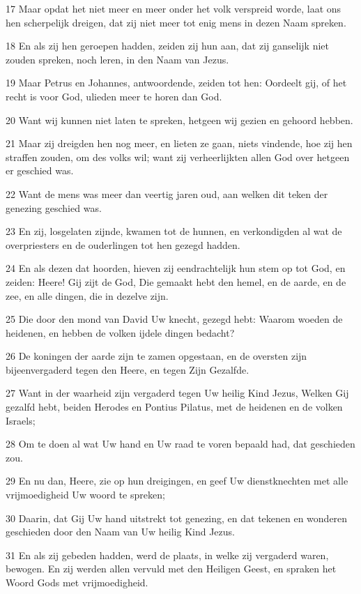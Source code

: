 \par 17 Maar opdat het niet meer en meer onder het volk verspreid worde, laat ons hen scherpelijk dreigen, dat zij niet meer tot enig mens in dezen Naam spreken.
\par 18 En als zij hen geroepen hadden, zeiden zij hun aan, dat zij ganselijk niet zouden spreken, noch leren, in den Naam van Jezus.
\par 19 Maar Petrus en Johannes, antwoordende, zeiden tot hen: Oordeelt gij, of het recht is voor God, ulieden meer te horen dan God.
\par 20 Want wij kunnen niet laten te spreken, hetgeen wij gezien en gehoord hebben.
\par 21 Maar zij dreigden hen nog meer, en lieten ze gaan, niets vindende, hoe zij hen straffen zouden, om des volks wil; want zij verheerlijkten allen God over hetgeen er geschied was.
\par 22 Want de mens was meer dan veertig jaren oud, aan welken dit teken der genezing geschied was.
\par 23 En zij, losgelaten zijnde, kwamen tot de hunnen, en verkondigden al wat de overpriesters en de ouderlingen tot hen gezegd hadden.
\par 24 En als dezen dat hoorden, hieven zij eendrachtelijk hun stem op tot God, en zeiden: Heere! Gij zijt de God, Die gemaakt hebt den hemel, en de aarde, en de zee, en alle dingen, die in dezelve zijn.
\par 25 Die door den mond van David Uw knecht, gezegd hebt: Waarom woeden de heidenen, en hebben de volken ijdele dingen bedacht?
\par 26 De koningen der aarde zijn te zamen opgestaan, en de oversten zijn bijeenvergaderd tegen den Heere, en tegen Zijn Gezalfde.
\par 27 Want in der waarheid zijn vergaderd tegen Uw heilig Kind Jezus, Welken Gij gezalfd hebt, beiden Herodes en Pontius Pilatus, met de heidenen en de volken Israels;
\par 28 Om te doen al wat Uw hand en Uw raad te voren bepaald had, dat geschieden zou.
\par 29 En nu dan, Heere, zie op hun dreigingen, en geef Uw dienstknechten met alle vrijmoedigheid Uw woord te spreken;
\par 30 Daarin, dat Gij Uw hand uitstrekt tot genezing, en dat tekenen en wonderen geschieden door den Naam van Uw heilig Kind Jezus.
\par 31 En als zij gebeden hadden, werd de plaats, in welke zij vergaderd waren, bewogen. En zij werden allen vervuld met den Heiligen Geest, en spraken het Woord Gods met vrijmoedigheid.
